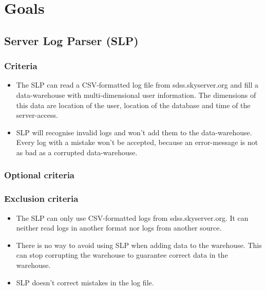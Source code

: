 \section{Goals}

\subsection{Server Log Parser (SLP)}


\subsubsection{Criteria} %
\begin{itemize}
\item The SLP can read a CSV-formatted log file from sdss.skyserver.org
 and fill a data-warehouse with multi-dimensional user information.
 The dimensions of this data are location of the user, location of the 
 database and time of the server-access. 
\item SLP will recognise invalid logs and won't add them to the data-warehouse.
 Every log with a mistake won't be accepted, because an error-message is not 
 as bad as a corrupted data-warehouse. 
\end{itemize}

\subsubsection{Optional criteria}

\subsubsection{Exclusion criteria}
\begin{itemize}
\item The SLP can only use CSV-formatted logs from sdss.skyserver.org. 
It can neither read logs in another format nor logs
from another source.
\item There is no way to avoid using SLP when adding data to the warehouse. 
This can stop corrupting the warehouse to guarantee correct data in the warehouse.
\item SLP doesn't correct mistakes in the log file.
\end{itemize}



